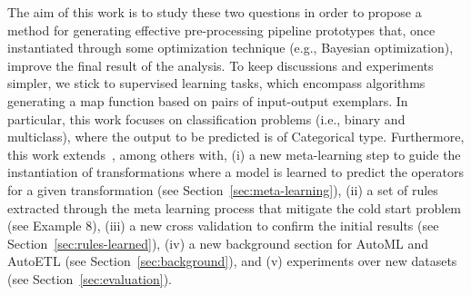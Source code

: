 The aim of this work is to study these two questions in order to propose a method for generating effective pre-processing pipeline prototypes that, once instantiated through some optimization technique (e.g., Bayesian optimization), improve the final result of the analysis.
To keep discussions and experiments simpler, we stick to supervised learning tasks, which encompass algorithms generating a map function based on pairs of input-output exemplars. In particular, this work focuses on classification problems (i.e., binary and multiclass), where the output to be predicted is of Categorical type. Furthermore, this work extends~\cite{Giovanelli2021DOLAP}, among others with, (i) a new meta-learning step to guide the instantiation of transformations where a model is learned to predict the operators for a given transformation (see Section~\ref{sec:meta-learning}),
(ii) a set of rules extracted through the meta learning process that mitigate the cold start problem (see Example 8), (iii) a new cross validation to confirm the initial results (see Section~\ref{sec:rules-learned}),
(iv) a new background section for AutoML and AutoETL (see Section~\ref{sec:background}), and (v) experiments over new datasets (see Section~\ref{sec:evaluation}). 



